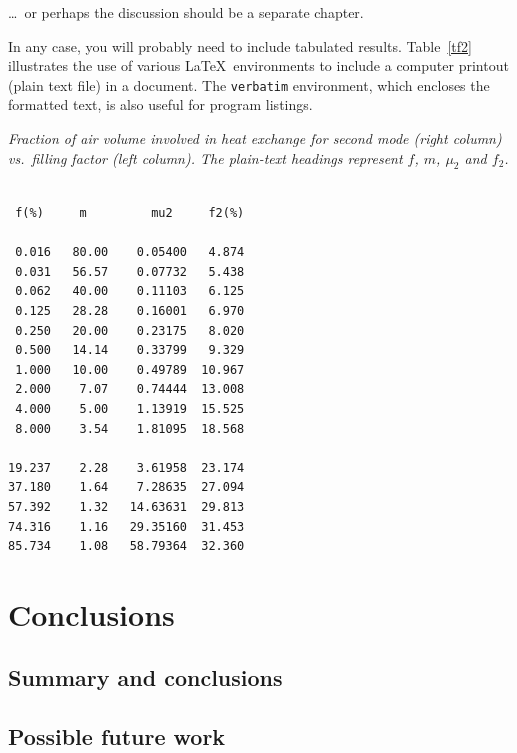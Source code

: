 \documentclass[12pt,openany,a4paper]{book}
\renewcommand{\baselinestretch}{1.2}	%
\newcommand{\tab}[1]  {Table~\ref{#1}}		%
\begin{document}
\ldots\ or perhaps the discussion should be a separate chapter.

In any case, you will probably need to include tabulated results.
\tab{tf2} illustrates the use of various \LaTeX\ environments to
include a computer printout (plain text file) in a document.  The
\texttt{verbatim} environment, which encloses the formatted text, is
also useful for program listings.

\begin{table}\renewcommand{\baselinestretch}{1.0}
\caption{\sl Fraction of air volume involved in heat exchange for
second mode (right column) vs.\ filling factor (left column).  The
plain-text headings represent $f$, $m$, $\mu_2$ and $f_2$.}
\label{tf2}

\begin{center}
\begin{minipage}[c]{2.85in}\small\normalsize
\begin{verbatim}

 f(%)     m         mu2     f2(%)

 0.016   80.00    0.05400   4.874
 0.031   56.57    0.07732   5.438
 0.062   40.00    0.11103   6.125
 0.125   28.28    0.16001   6.970
 0.250   20.00    0.23175   8.020
 0.500   14.14    0.33799   9.329
 1.000   10.00    0.49789  10.967
 2.000    7.07    0.74444  13.008
 4.000    5.00    1.13919  15.525
 8.000    3.54    1.81095  18.568

19.237    2.28    3.61958  23.174
37.180    1.64    7.28635  27.094
57.392    1.32   14.63631  29.813
74.316    1.16   29.35160  31.453
85.734    1.08   58.79364  32.360
\end{verbatim}
\end{minipage}
\end{center}
\end{table}

\chapter{Conclusions}

\section{Summary and conclusions}

\section{Possible future work}

\appendix
\end{document}
